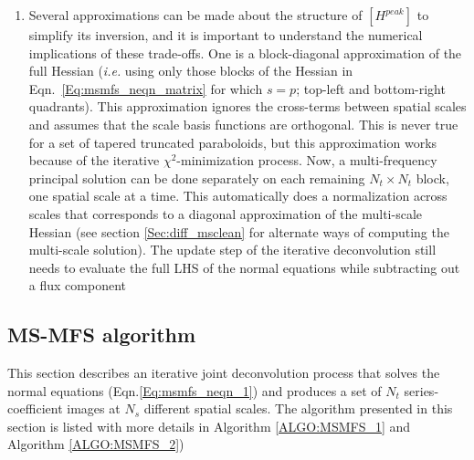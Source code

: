 \documentclass[structabstract]{stylefiles/aa}
\begin{document}
\begin{enumerate}
\item 
Several approximations can be made about the structure
of $[H^{peak}]$ to simplify its inversion, and it is 
important to understand the numerical implications of these trade-offs.
%
One is a block-diagonal approximation of the full 
Hessian ({\it i.e.} using only those blocks of the Hessian in
Eqn.~\ref{Eq:msmfs_neqn_matrix} for which $s=p$; top-left
and bottom-right quadrants).
This approximation ignores the cross-terms between spatial scales and assumes that
the scale basis functions are orthogonal. 
This is never true for a set of tapered truncated paraboloids, but
this approximation works because of the iterative $\chi^2$-minimization
process.
Now, a multi-frequency principal solution 
can be done separately on each remaining $N_t\times N_t$ block,  
one spatial scale at a time.
This automatically does a normalization across scales that corresponds to a diagonal
approximation of the multi-scale Hessian 
(see section \ref{Sec:diff_msclean} for 
alternate ways of computing the multi-scale solution).
The update  step of the iterative deconvolution still needs to evaluate
the full LHS of the normal equations while subtracting out a flux component

\end{enumerate}

\subsection{MS-MFS algorithm}\label{Sec:MSMFS}

This section describes an iterative joint deconvolution process that 
solves the normal equations (Eqn.\ref{Eq:msmfs_neqn_1}) and produces a
set of $N_t$ series-coefficient images at $N_s$ different spatial scales.
The algorithm presented in this section is listed with more details
in Algorithm \vref{ALGO:MSMFS_1} and Algorithm \vref{ALGO:MSMFS_2}) 
\end{document}
